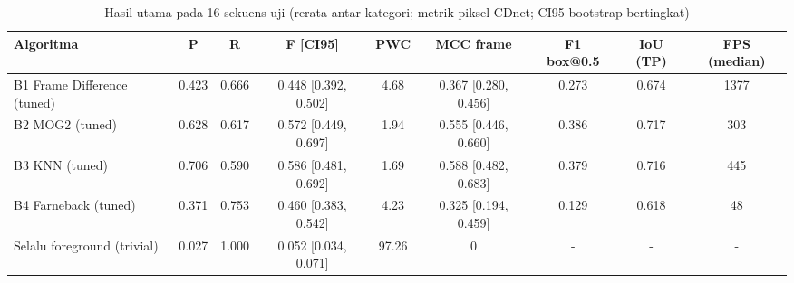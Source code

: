 \begin{table}[t]
\centering
\caption{Hasil utama pada 16 sekuens uji (rerata antar-kategori; metrik piksel CDnet; CI95 bootstrap bertingkat)}
\label{tab:table_main}
\begin{tabular}{lcccccccc}
\toprule
Algoritma & P & R & F [CI95] & PWC & MCC frame & F1 box@0.5 & IoU (TP) & FPS (median) \\
\midrule
B1 Frame Difference (tuned) & 0.423 & 0.666 & 0.448 [0.392, 0.502] & 4.68 & 0.367 [0.280, 0.456] & 0.273 & 0.674 & 1377 \\
B2 MOG2 (tuned) & 0.628 & 0.617 & 0.572 [0.449, 0.697] & 1.94 & 0.555 [0.446, 0.660] & 0.386 & 0.717 & 303 \\
B3 KNN (tuned) & 0.706 & 0.590 & 0.586 [0.481, 0.692] & 1.69 & 0.588 [0.482, 0.683] & 0.379 & 0.716 & 445 \\
B4 Farneback (tuned) & 0.371 & 0.753 & 0.460 [0.383, 0.542] & 4.23 & 0.325 [0.194, 0.459] & 0.129 & 0.618 & 48 \\
Selalu foreground (trivial) & 0.027 & 1.000 & 0.052 [0.034, 0.071] & 97.26 & 0 & - & - & - \\
\bottomrule
\end{tabular}
\end{table}
